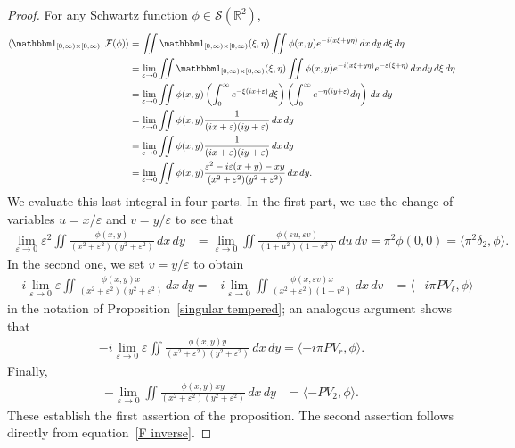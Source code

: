 \documentclass[11pt]{article}
\theoremstyle{plain}
\theoremstyle{definition}
\numberwithin{equation}{section}
\newcommand{\R}{\mathbb R}
\newcommand{\0}{{\vec 0}}
\begin{document}
\begin{proof}
For any Schwartz function $\phi\in\mathcal{S}(\R^2)$,
\begin{align*}
\langle\mathbbm1_{[0,\infty)\times[0,\infty)},\mathcal{F}(\phi)\rangle&=\iint \mathbbm1_{[0,\infty)\times[0,\infty)}(\xi,\eta)\iint \phi(x,y)e^{-i(x\xi+y\eta)}  \,dx\,dy \,d\xi\,d\eta \\
&=\lim_{\varepsilon\rightarrow 0}\iint \mathbbm1_{[0,\infty)\times[0,\infty)}(\xi,\eta)\iint \phi(x,y)e^{-i(x\xi+y\eta)}e^{-\varepsilon(\xi+\eta)}  \,dx\,dy \,d\xi\,d\eta \\
&=\lim_{\varepsilon\rightarrow 0}\iint  \phi(x,y)\left(\int_0^\infty e^{-\xi(ix+\varepsilon)}d\xi\right) \left(\int_0^\infty e^{-\eta(iy+\varepsilon)}d\eta\right)  \,dx\,dy \\
&=\lim_{\varepsilon\rightarrow 0}\iint  \phi(x,y)\frac1{(ix+\varepsilon)(iy+\varepsilon)}  \,dx\,dy \\
&=\lim_{\varepsilon\rightarrow 0}\iint  \phi(x,y)\frac1{(ix+\varepsilon)(iy+\varepsilon)}  \,dx\,dy \\
&=\lim_{\varepsilon\rightarrow 0}\iint  \phi(x,y)\frac{\varepsilon^2-i\varepsilon (x+y)-xy}{(x^2+\varepsilon^2)(y^2+\varepsilon^2)}  \,dx\,dy.
\end{align*}
We evaluate this last integral in four parts. In the first part, we use the change of variables $u=x/\varepsilon$ and $v=y/\varepsilon$ to see that
\begin{align*}
\lim_{\varepsilon\rightarrow 0}\varepsilon^2\iint \frac{\phi(x,y)}{(x^2+\varepsilon^2)(y^2+\varepsilon^2)} \,dx\,dy&= \lim_{\varepsilon\rightarrow 0}\iint  \frac{\phi(\varepsilon u,\varepsilon v)}{(1+u^2)(1+v^2)} \,du\,dv = \pi^2\phi(0,0)=\langle\pi^2\delta_2,\phi\rangle.
\end{align*}
In the second one, we set $v=y/\varepsilon$ to obtain
\begin{align*}
-i\lim_{\varepsilon\rightarrow 0} \varepsilon \iint \frac{\phi(x,y) x}{(x^2+\varepsilon^2)(y^2+\varepsilon^2)} \,dx\,dy=-i\lim_{\varepsilon\rightarrow 0} \iint \frac{\phi(x,\varepsilon v) x}{(x^2+\varepsilon^2)(1+v^2)} \,dx\,dv&=\langle-i\pi PV_\ell,\phi\rangle
\end{align*}
in the notation of Proposition~\ref{singular tempered};
an analogous argument shows that
\begin{align*}
-i\lim_{\varepsilon\rightarrow 0} \varepsilon \iint \frac{\phi(x,y)y}{(x^2+\varepsilon^2)(y^2+\varepsilon^2)} \,dx\,dy=\langle-i\pi PV_r,\phi\rangle.
\end{align*}
Finally,
\begin{align*}
-\lim_{\varepsilon\rightarrow 0}\iint \frac{\phi(x,y)xy}{(x^2+\varepsilon^2)(y^2+\varepsilon^2)} \,dx\,dy&=\langle-PV_2,\phi\rangle.
\end{align*}
These establish the first assertion of the proposition.  The second assertion follows directly from equation~\eqref{F inverse}.
\end{proof}
\end{document}

